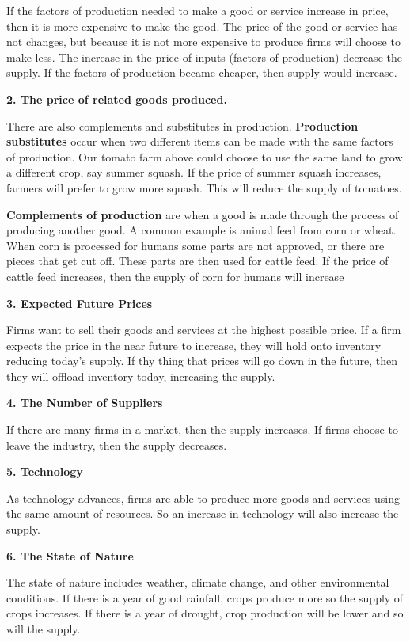 \documentclass[
]{book}
\begin{document}
If the factors of production needed to make a good or service increase in price, then it is more expensive to make the good. The price of the good or service has not changes, but because it is not more expensive to produce firms will choose to make less. The increase in the price of inputs (factors of production) decrease the supply. If the factors of production became cheaper, then supply would increase.

\textbf{2. The price of related goods produced.}

There are also complements and substitutes in production. \textbf{Production substitutes} occur when two different items can be made with the same factors of production. Our tomato farm above could choose to use the same land to grow a different crop, say summer squash. If the price of summer squash increases, farmers will prefer to grow more squash. This will reduce the supply of tomatoes.

\textbf{Complements of production} are when a good is made through the process of producing another good. A common example is animal feed from corn or wheat. When corn is processed for humans some parts are not approved, or there are pieces that get cut off. These parts are then used for cattle feed. If the price of cattle feed increases, then the supply of corn for humans will increase

\textbf{3. Expected Future Prices}

Firms want to sell their goods and services at the highest possible price. If a firm expects the price in the near future to increase, they will hold onto inventory reducing today's supply. If thy thing that prices will go down in the future, then they will offload inventory today, increasing the supply.

\textbf{4. The Number of Suppliers}

If there are many firms in a market, then the supply increases. If firms choose to leave the industry, then the supply decreases.

\textbf{5. Technology}

As technology advances, firms are able to produce more goods and services using the same amount of resources. So an increase in technology will also increase the supply.

\textbf{6. The State of Nature}

The state of nature includes weather, climate change, and other environmental conditions. If there is a year of good rainfall, crops produce more so the supply of crops increases. If there is a year of drought, crop production will be lower and so will the supply.
\end{document}
